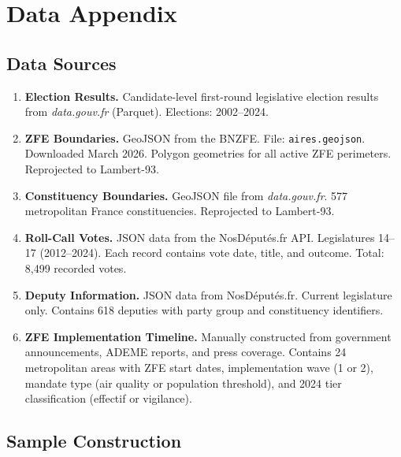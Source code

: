 \documentclass[12pt]{article}
\begin{document}
\label{apep_main_text_end}
\newpage


\newpage
\appendix

\section{Data Appendix}
\label{app:data}

\subsection{Data Sources}

\begin{enumerate}\sloppy
\item \textbf{Election Results.} Candidate-level first-round legislative election results from \textit{data.gouv.fr} (Parquet). Elections: 2002--2024.

\item \textbf{ZFE Boundaries.} GeoJSON from the BNZFE. File: \texttt{aires.geojson}. Downloaded March 2026. Polygon geometries for all active ZFE perimeters. Reprojected to Lambert-93.

\item \textbf{Constituency Boundaries.} GeoJSON file from \textit{data.gouv.fr}. 577 metropolitan France constituencies. Reprojected to Lambert-93.

\item \textbf{Roll-Call Votes.} JSON data from the NosDéputés.fr API. Legislatures 14--17 (2012--2024). Each record contains vote date, title, and outcome. Total: 8,499 recorded votes.

\item \textbf{Deputy Information.} JSON data from NosDéputés.fr. Current legislature only. Contains 618 deputies with party group and constituency identifiers.

\item \textbf{ZFE Implementation Timeline.} Manually constructed from government announcements, ADEME reports, and press coverage. Contains 24 metropolitan areas with ZFE start dates, implementation wave (1 or 2), mandate type (air quality or population threshold), and 2024 tier classification (effectif or vigilance).
\end{enumerate}

\subsection{Sample Construction}
\end{document}
